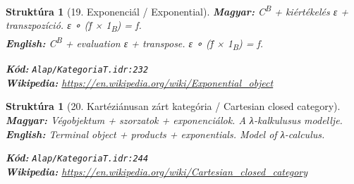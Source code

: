 \documentclass[11pt,a4paper,twocolumn]{article}
\newtheorem{struktura}[tetel]{Struktúra}
\begin{document}
\begin{struktura}[19. Exponenciál / Exponential]

\textbf{Magyar:} C\textsuperscript{B} + kiértékelés ε + transzpozíció. ε ∘ (f̃ × 1\textsubscript{B}) = f.\\

\textbf{English:} C\textsuperscript{B} + evaluation ε + transpose. ε ∘ (f̃ × 1\textsubscript{B}) = f.\\

\begin{center}
\end{center}

\textbf{Kód:} \texttt{Alap/KategoriaT.idr:232}\\
\textbf{Wikipedia:} \url{https://en.wikipedia.org/wiki/Exponential_object}

\end{struktura}

\vspace{0.5cm}

\begin{struktura}[20. Kartéziánusan zárt kategória / Cartesian closed category]

\textbf{Magyar:} Végobjektum + szorzatok + exponenciálok. A λ-kalkulusus modellje.\\

\textbf{English:} Terminal object + products + exponentials. Model of λ-calculus.\\

\begin{center}
\end{center}

\textbf{Kód:} \texttt{Alap/KategoriaT.idr:244}\\
\textbf{Wikipedia:} \url{https://en.wikipedia.org/wiki/Cartesian_closed_category}

\end{struktura}

\vspace{0.5cm}
\end{document}
